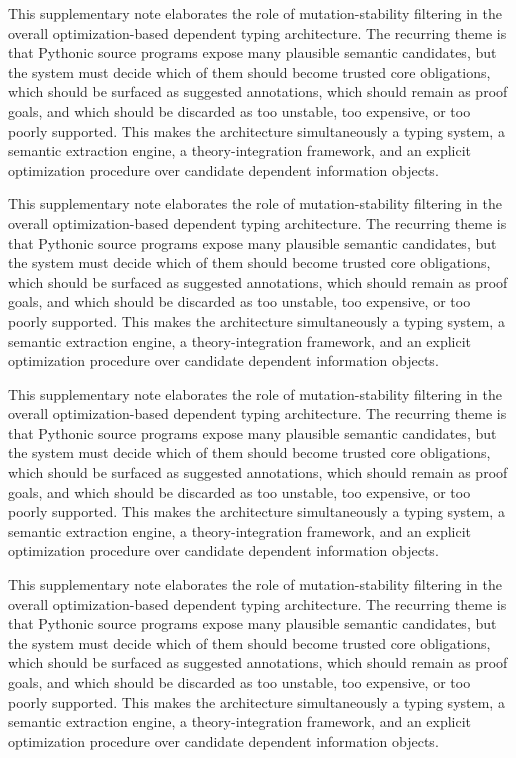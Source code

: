 \documentclass[11pt]{article}
\theoremstyle{definition}
\theoremstyle{plain}
\begin{document}
This supplementary note elaborates the role of mutation-stability filtering in the overall
optimization-based dependent typing architecture. The recurring theme is that
Pythonic source programs expose many plausible semantic candidates, but the
system must decide which of them should become trusted core obligations, which
should be surfaced as suggested annotations, which should remain as proof
goals, and which should be discarded as too unstable, too expensive, or too
poorly supported. This makes the architecture simultaneously a typing system,
a semantic extraction engine, a theory-integration framework, and an explicit
optimization procedure over candidate dependent information objects.

This supplementary note elaborates the role of mutation-stability filtering in the overall
optimization-based dependent typing architecture. The recurring theme is that
Pythonic source programs expose many plausible semantic candidates, but the
system must decide which of them should become trusted core obligations, which
should be surfaced as suggested annotations, which should remain as proof
goals, and which should be discarded as too unstable, too expensive, or too
poorly supported. This makes the architecture simultaneously a typing system,
a semantic extraction engine, a theory-integration framework, and an explicit
optimization procedure over candidate dependent information objects.

This supplementary note elaborates the role of mutation-stability filtering in the overall
optimization-based dependent typing architecture. The recurring theme is that
Pythonic source programs expose many plausible semantic candidates, but the
system must decide which of them should become trusted core obligations, which
should be surfaced as suggested annotations, which should remain as proof
goals, and which should be discarded as too unstable, too expensive, or too
poorly supported. This makes the architecture simultaneously a typing system,
a semantic extraction engine, a theory-integration framework, and an explicit
optimization procedure over candidate dependent information objects.

This supplementary note elaborates the role of mutation-stability filtering in the overall
optimization-based dependent typing architecture. The recurring theme is that
Pythonic source programs expose many plausible semantic candidates, but the
system must decide which of them should become trusted core obligations, which
should be surfaced as suggested annotations, which should remain as proof
goals, and which should be discarded as too unstable, too expensive, or too
poorly supported. This makes the architecture simultaneously a typing system,
a semantic extraction engine, a theory-integration framework, and an explicit
optimization procedure over candidate dependent information objects.
\end{document}
